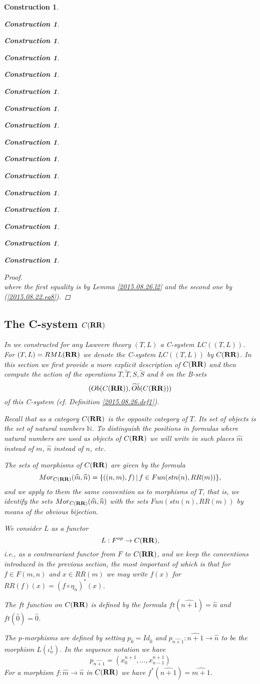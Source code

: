 \documentclass[12pt]{amsart}
\numberwithin{proposition}{subsection}
\newtheorem{construction}[proposition]{Construction}
\newcommand{\llabel}[1]{\label{#1}}
\newcommand{\sr}{\rightarrow}
\newcommand{\nn}{{\mathbb N}}
\newcommand{\nat}{\nn}
\newcommand{\wt}{\widetilde}
\newcommand{\wh}{\widehat}
\newcommand{\mbind}[1]{{#1^*}}
\newcommand{\RR}{{\bf RR}}
\begin{document}
\begin{construction}
\begin{construction}
\begin{construction}
\begin{construction}
\begin{construction}
\begin{construction}
\begin{construction}
\begin{construction}
\begin{construction}
\begin{construction}
\begin{construction}
\begin{construction}
\begin{construction}
\begin{construction}
\begin{construction}
\begin{construction}
\begin{proof}
\begin{equation*}
\end{equation*}
where the first equality is by Lemma \ref{2015.08.26.l2} and the second one by
(\ref{2015.08.22.eq8}).
\end{proof}
%

\subsection{The C-system $C(\RR)$}
%
\llabel{CRR}

In \cite{LandC} we constructed for any Lawvere theory $(T,L)$ a C-system
$LC((T,L))$. For $(T,L)=RML(\RR)$ we denote the C-system $LC((T,L))$ by
$C(\RR)$. In this section we first provide a more explicit description of
$C(\RR)$ and then compute the action of the operations $T,\wt{T},S,\wt{S}$ and
$\delta$ on the B-sets $$(Ob(C(\RR)),\wt{Ob}(C(\RR)))$$ of this C-system
(cf.{} Definition \ref{2015.08.26.def1}).

Recall that as a category $C(\RR)$ is the opposite category of $T$.  Its set of
objects is the set of natural numbers $\nat$. To distinguish the positions in
formulas where natural numbers are used as objects of $C(\RR)$ we will write in
such places $\wh{m}$ instead of $m$, $\wh{n}$ instead of $n$, etc.

The sets of morphisms of $C(\RR)$ are given by the formula 
%
$$Mor_{C(\RR)}(\wh{m},\wh{n})=\{((n,m),f)\,|\,f\in Fun(stn(n),RR(m))\},$$
%
and we apply to them the same convention as to morphisms of $T$, that is, we
identify the sets $Mor_{C(\RR)}(\wh{m},\wh{n})$ with the sets
$Fun(stn(n),RR(m))$ by means of the obvious bijection.

We consider $L$ as a functor
%
$${L}:F^{op}\sr C(\RR),$$
%
i.e., as a contravariant functor from $F$ to $C(\RR)$, and we keep the conventions
introduced in the previous section, the most important of which is that for
$f\in F(m,n)$ and $x\in RR(m)$ we may write $f(x)$ for 
$RR(f)(x)=\mbind{(f\circ \eta_{n})}(x)$.

The $ft$ function on $C(\RR)$ is defined by the formula $ft(\wh{n+1})=\wh{n}$
and $ft(\wh{0})=\wh{0}$.

The $p$-morphisms are defined by setting $p_{\wh{0}}=Id_{\wh{0}}$ and
$p_{\wh{n+1}}:\wh{n+1}\sr \wh{n}$ to be the morphism $L(\iota_n^1)$. In the
sequence notation we have
%
\begin{equation}\llabel{2015.08.24.eq6}
p_{\wh{n+1}}=(x_0^{n+1},\dots,x_{n-1}^{n+1})
\end{equation}%
%
For a morphism $f:\wh{m}\sr \wh{n}$ in $C(\RR)$ we have $f^*(\wh{n+1})=\wh{m+1}$. 


\end{construction}
\end{construction}
\end{construction}
\end{construction}
\end{construction}
\end{construction}
\end{construction}
\end{construction}
\end{construction}
\end{construction}
\end{construction}
\end{construction}
\end{construction}
\end{construction}
\end{construction}
\end{construction}
\end{document}
